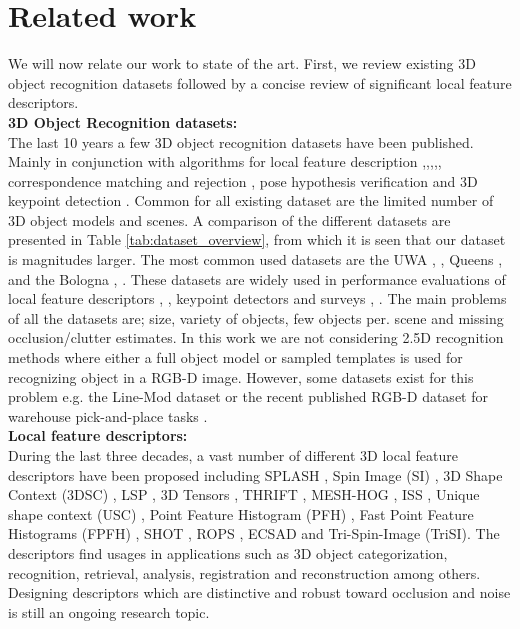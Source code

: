\documentclass[10pt,twocolumn,letterpaper]{article}
\begin{document}
\section{Related work}\label{sec:related_work}
We will now relate our work to state of the art. First, we review existing 3D object recognition datasets followed by a concise review of significant local feature descriptors.\\

\noindent
\textbf{3D Object Recognition datasets:}\\
The last 10 years a few 3D object recognition datasets have been published. Mainly in conjunction with algorithms for local feature description \cite{Mian2006},\cite{Taati2007},\cite{Taati2011},\cite{Tombari2010},\cite{Salti2014}, correspondence matching and rejection \cite{Rodola2013}, pose hypothesis verification \cite{Aldoma2012} and 3D keypoint detection \cite{Mian2010}. Common for all existing dataset are the limited number of 3D object models and scenes. A comparison of the different datasets are presented in Table \ref{tab:dataset_overview}, from which it is seen that our dataset is magnitudes larger. The most common used datasets are the UWA  \cite{Mian2006}, \cite{Mian2010}, Queens \cite{Taati2007},\cite{Taati2011} and the Bologna \cite{Salti2014}, \cite{Tombari2010}. These datasets are widely used in performance evaluations of  local feature descriptors \cite{Guo2015}, \cite{Buch2016}, keypoint detectors \cite{Salti2011} and surveys \cite{Guo2014}, \cite{FilipeAlexandre2014}. The main problems of all the datasets are; size, variety of objects, few objects per. scene and missing occlusion/clutter estimates. 
In this work we are not considering 2.5D recognition methods where either a full object model or sampled templates is used for recognizing object in a RGB-D image. However, some datasets exist for this problem e.g. the Line-Mod dataset \cite{Hinterstoisser2012} or the recent published RGB-D dataset for warehouse pick-and-place tasks \cite{Rennie2015}.\\   

\noindent
\textbf{Local feature descriptors:}\\
During the last three decades, a vast number of different 3D local feature descriptors have been proposed including SPLASH \cite{Stein1992}, Spin Image (SI) \cite{Johnson1999}, 3D Shape Context (3DSC) \cite{Frome2004}, LSP \cite{ChenBhanu2004}, 3D Tensors \cite{Mian2006}, THRIFT \cite{Flint2007}, MESH-HOG \cite{Zaharescu2009}, ISS \cite{Zhong2009}, Unique shape context (USC) \cite{usc2010}, Point Feature Histogram (PFH) \cite{Rusu2008}, Fast Point Feature Histograms (FPFH) \cite{Fpfh2009}, SHOT \cite{Tombari2010}, ROPS \cite{Guo2013}, ECSAD \cite{Ecsad2015} and Tri-Spin-Image (TriSI)\cite{Guo2015}. The descriptors find usages in applications such as 3D object categorization, recognition, retrieval, analysis, registration and reconstruction among others. Designing descriptors which are distinctive and robust toward occlusion and noise is still an ongoing research topic. 
\end{document}
